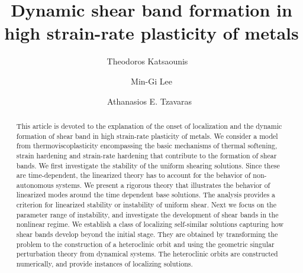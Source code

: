 \documentclass[a4paper,11pt]{article}
\theoremstyle{remark}
\begin{document}
\title{Dynamic shear band formation in high strain-rate plasticity of metals}
\author{Theodoros Katsaounis\footnotemark[1]\ \footnotemark[2]\ \footnotemark[3]
\and Min-Gi Lee\footnotemark[1]
\and Athanasios E. Tzavaras\footnotemark[1]\  \footnotemark[4]}
\date{}

\maketitle
\renewcommand{\thefootnote}{\fnsymbol{footnote}}
\renewcommand{\thefootnote}{\arabic{footnote}}

 \begin{abstract}
 This article is devoted to the explanation of the onset of localization and the dynamic formation of shear band in high strain-rate plasticity of metals.
 We consider a model from thermoviscoplasticity encompassing the basic mechanisms of thermal softening, strain hardening and strain-rate hardening
 that contribute to the formation of shear bands. We first investigate the stability of the uniform shearing solutions.
 Since these are time-dependent, the linearized theory has to account for the behavior of  non-autonomous systems.
 We present a rigorous theory that illustrates the behavior of  linearized modes around the time dependent base solutions.
 The analysis provides a criterion for linearized stability or instability of uniform shear. Next we focus on the parameter range of instability,
 and investigate the development of shear bands in the nonlinear regime. We establish a class of localizing self-similar solutions
 capturing  how shear bands develop beyond the initial stage. They are obtained by transforming the problem to the construction
 of a heteroclinic orbit and using the geometric singular perturbation theory from dynamical systems.
 The heteroclinic orbits are constructed numerically, and provide instances of  localizing solutions.
 \end{abstract}

 \tableofcontents
\end{document}
